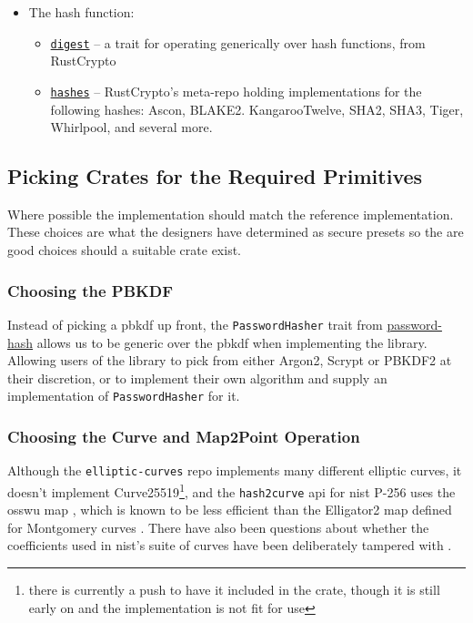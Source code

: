 \begin{itemize}
  \item{
    The hash function:
    \begin{itemize}
      \item{\href{https://github.com/RustCrypto/traits/tree/master/digest}{\texttt{digest}} -- a trait for operating generically over hash functions, from RustCrypto}
      \item{\href{https://github.com/RustCrypto/hashes}{\texttt{hashes}} -- RustCrypto's meta-repo holding implementations for the following hashes: Ascon, BLAKE2. KangarooTwelve, SHA2, SHA3, Tiger, Whirlpool, and several more.}
    \end{itemize}
  }
\end{itemize}

\subsection{Picking Crates for the Required Primitives}
Where possible the implementation should match the reference implementation.
These choices are what the designers have determined as secure presets so the are good choices should a suitable crate exist.

\subsubsection{Choosing the PBKDF}
Instead of picking a \gls{pbkdf} up front, the \texttt{PasswordHasher} trait from \href{https://github.com/RustCrypto/traits/tree/master/password-hash}{password-hash} allows us to be generic over the \gls{pbkdf} when implementing the library.
Allowing users of the library to pick from either Argon2, Scrypt or PBKDF2 at their discretion, or to implement their own algorithm and supply an implementation of \texttt{PasswordHasher} for it.

\subsubsection{Choosing the Curve and \textsf{Map2Point} Operation}
Although the \texttt{elliptic-curves} repo implements many different elliptic curves, it doesn't implement Curve25519\footnote{there is currently a push to have it included in the crate, though it is still early on and the implementation is not fit for use}, and the \texttt{hash2curve} \gls{api} for \gls{nist} P-256 uses the \gls{osswu} map \cite{osswu-map}, which is known to be less efficient than the Elligator2 map defined for Montgomery curves \cite{elligator2}.
There have also been questions about whether the coefficients used in \gls{nist}'s suite of curves have been deliberately tampered with \cite{curve-rigidity}.

